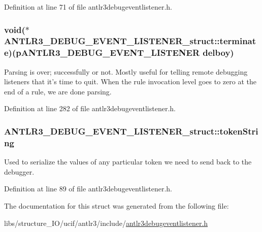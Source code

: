 Definition at line 71 of file antlr3debugeventlistener.\-h.

\hypertarget{struct_a_n_t_l_r3___d_e_b_u_g___e_v_e_n_t___l_i_s_t_e_n_e_r__struct_a61c8813b991db07c7a0dc14be8d9bf96}{
\subsubsection[{terminate}]{\setlength{\rightskip}{0pt plus 5cm}void($\ast$ A\-N\-T\-L\-R3\-\_\-\-D\-E\-B\-U\-G\-\_\-\-E\-V\-E\-N\-T\-\_\-\-L\-I\-S\-T\-E\-N\-E\-R\-\_\-struct\-::terminate)({\bf p\-A\-N\-T\-L\-R3\-\_\-\-D\-E\-B\-U\-G\-\_\-\-E\-V\-E\-N\-T\-\_\-\-L\-I\-S\-T\-E\-N\-E\-R} delboy)}}\label{struct_a_n_t_l_r3___d_e_b_u_g___e_v_e_n_t___l_i_s_t_e_n_e_r__struct_a61c8813b991db07c7a0dc14be8d9bf96}
Parsing is over; successfully or not. Mostly useful for telling remote debugging listeners that it's time to quit. When the rule invocation level goes to zero at the end of a rule, we are done parsing. 

Definition at line 282 of file antlr3debugeventlistener.\-h.

\hypertarget{struct_a_n_t_l_r3___d_e_b_u_g___e_v_e_n_t___l_i_s_t_e_n_e_r__struct_aa632f6a33c2a4a7471e2b76baa6264c3}{
\subsubsection[{token\-String}]{ A\-N\-T\-L\-R3\-\_\-\-D\-E\-B\-U\-G\-\_\-\-E\-V\-E\-N\-T\-\_\-\-L\-I\-S\-T\-E\-N\-E\-R\-\_\-struct\-::token\-String}}\label{struct_a_n_t_l_r3___d_e_b_u_g___e_v_e_n_t___l_i_s_t_e_n_e_r__struct_aa632f6a33c2a4a7471e2b76baa6264c3}
Used to serialize the values of any particular token we need to send back to the debugger. 

Definition at line 89 of file antlr3debugeventlistener.\-h.



The documentation for this struct was generated from the following file\-:\begin{DoxyCompactItemize}
\item 
libs/structure\-\_\-\-I\-O/ucif/antlr3/include/\hyperlink{antlr3debugeventlistener_8h}{antlr3debugeventlistener.\-h}\end{DoxyCompactItemize}
